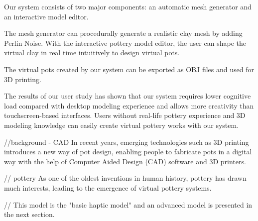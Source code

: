 Our system consists of two major components: an automatic mesh generator and an interactive model editor.

The mesh generator can procedurally generate a realistic clay mesh by adding Perlin Noise. With the interactive pottery model editor, the user can shape the virtual clay in real time intuitively to design virtual pots.

The virtual pots created by our system can be exported as OBJ files and used for 3D printing.

The results of our user study has shown that our system requires lower cognitive load compared with desktop modeling experience and allows more creativity than touchscreen-based interfaces. Users without real-life pottery experience and 3D modeling knowledge can easily create virtual pottery works with our system.

//background - CAD
In recent years, emerging technologies such as 3D printing introduces a new way of pot design, enabling people to fabricate pots in a digital way with the help of Computer Aided Design (CAD) software and 3D printers.

// pottery 
As one of the oldest inventions in human history, pottery has drawn much interests, leading to the emergence of virtual pottery systems.




// This model is the "basic haptic model" and an advanced model is presented in the next section.



